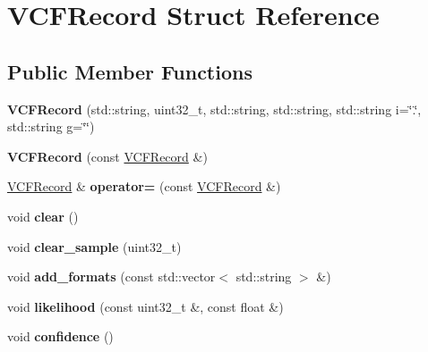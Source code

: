 \hypertarget{structVCFRecord}{}\section{V\+C\+F\+Record Struct Reference}
\label{structVCFRecord}
\subsection*{Public Member Functions}
\begin{DoxyCompactItemize}
\item 
\mbox{\label{structVCFRecord_ae5fb81c0b593d1e21b046e336b5ce51a}} 
{\bfseries V\+C\+F\+Record} (std\+::string, uint32\+\_\+t, std\+::string, std\+::string, std\+::string i=\char`\"{}.\char`\"{}, std\+::string g=\char`\"{}\char`\"{})
\item 
\mbox{\label{structVCFRecord_af3f3230f9ecc1c99c5e543fb72e6f787}} 
{\bfseries V\+C\+F\+Record} (const \hyperlink{structVCFRecord}{V\+C\+F\+Record} \&)
\item 
\mbox{\label{structVCFRecord_a84cd091176e34ef977ed1b54f2710c83}} 
\hyperlink{structVCFRecord}{V\+C\+F\+Record} \& {\bfseries operator=} (const \hyperlink{structVCFRecord}{V\+C\+F\+Record} \&)
\item 
\mbox{\label{structVCFRecord_a30453a7d38b7b95de34ae5d0c829ceca}} 
void {\bfseries clear} ()
\item 
\mbox{\label{structVCFRecord_a320f11b04c13945685257623b1998bec}} 
void {\bfseries clear\+\_\+sample} (uint32\+\_\+t)
\item 
\mbox{\label{structVCFRecord_af4975a1462b648fac35ec293f74f4709}} 
void {\bfseries add\+\_\+formats} (const std\+::vector$<$ std\+::string $>$ \&)
\item 
\mbox{\label{structVCFRecord_aa8d663da339a028347efa387fcd0180c}} 
void {\bfseries likelihood} (const uint32\+\_\+t \&, const float \&)
\item 
\mbox{\label{structVCFRecord_aae4066c90ccaa1512826159efebc1524}} 
void {\bfseries confidence} ()

\end{DoxyCompactItemize}
